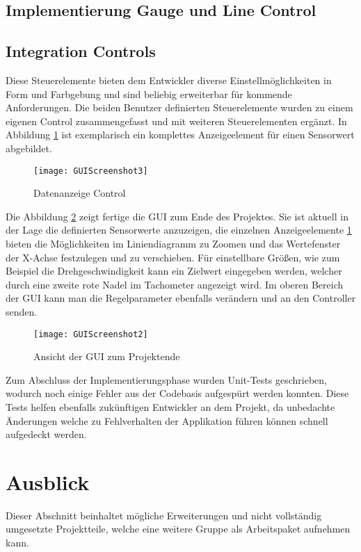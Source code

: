\newpage

\subsection{Implementierung Gauge und Line Control}



\newpage
{}
\subsection{Integration Controls}
Diese Steuerelemente bieten dem Entwickler diverse Einstellmöglichkeiten in Form und Farbgebung und sind beliebig erweiterbar für kommende Anforderungen. Die beiden Benutzer definierten Steuerelemente wurden zu einem eigenen Control zusammengefasst und mit weiteren Steuerelementen ergänzt. In Abbildung \ref{fig:control1} ist exemplarisch ein komplettes Anzeigeelement für einen Sensorwert abgebildet.

\begin{figure}[ht]
	\centering
		\texttt{[image: GUIScreenshot3]}
		\caption{Datenanzeige Control}
		\label{fig:control1}
\end{figure}

Die Abbildung \ref{fig:guifinal} zeigt fertige die GUI zum Ende des Projektes. Sie ist aktuell in der Lage die definierten Sensorwerte anzuzeigen, die einzelnen Anzeigeelemente \ref{fig:control1} bieten die Möglichkeiten im Liniendiagramm zu Zoomen und das Wertefenster der X-Achse festzulegen und zu verschieben. Für einstellbare Größen, wie zum Beispiel die Drehgeschwindigkeit kann ein Zielwert eingegeben werden, welcher durch eine zweite rote Nadel im Tachometer angezeigt wird. Im oberen Bereich der GUI kann man die Regelparameter ebenfalls verändern und an den Controller senden.

\begin{figure}[h]
	\centering
		\texttt{[image: GUIScreenshot2]}
		\caption{Ansicht der GUI zum Projektende}
		\label{fig:guifinal}
\end{figure}

Zum Abschluss der Implementierungsphase wurden Unit-Tests geschrieben, wodurch noch einige Fehler aus der Codebasis aufgespürt werden konnten. Diese Tests helfen ebenfalls zukünftigen Entwickler an dem Projekt, da unbedachte Änderungen welche zu Fehlverhalten der Applikation führen können schnell aufgedeckt werden.

\section{Ausblick}
Dieser Abschnitt beinhaltet mögliche Erweiterungen und nicht vollständig umgesetzte Projektteile, welche eine weitere Gruppe als Arbeitspaket aufnehmen kann. 

